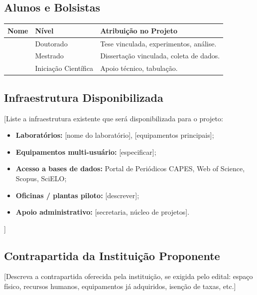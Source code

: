 \documentclass[
  12pt,
  a4paper,
  oneside,
  english,      %
  brazil
]{article}
\begin{document}
\subsection{Alunos e Bolsistas}

\begin{tabularx}{\textwidth}{llX}
  \toprule
  \textbf{Nome} & \textbf{Nível} & \textbf{Atribuição no Projeto} \\
  \midrule
  [Aluno 1] & Doutorado & Tese vinculada, experimentos, análise. \\
  [Aluno 2] & Mestrado  & Dissertação vinculada, coleta de dados. \\
  [Aluno 3] & Iniciação Científica & Apoio técnico, tabulação. \\
  \bottomrule
\end{tabularx}

\subsection{Infraestrutura Disponibilizada}

[Liste a infraestrutura existente que será disponibilizada para o projeto:

\begin{itemize}
  \item \textbf{Laboratórios:} [nome do laboratório], [equipamentos principais];
  \item \textbf{Equipamentos multi-usuário:} [especificar];
  \item \textbf{Acesso a bases de dados:} Portal de Periódicos CAPES,
        Web of Science, Scopus, SciELO;
  \item \textbf{Oficinas / plantas piloto:} [descrever];
  \item \textbf{Apoio administrativo:} [secretaria, núcleo de projetos].
\end{itemize}]

\subsection{Contrapartida da Instituição Proponente}

[Descreva a contrapartida oferecida pela instituição, se exigida pelo
edital: espaço físico, recursos humanos, equipamentos já adquiridos,
isenção de taxas, etc.]

\newpage
\end{document}
